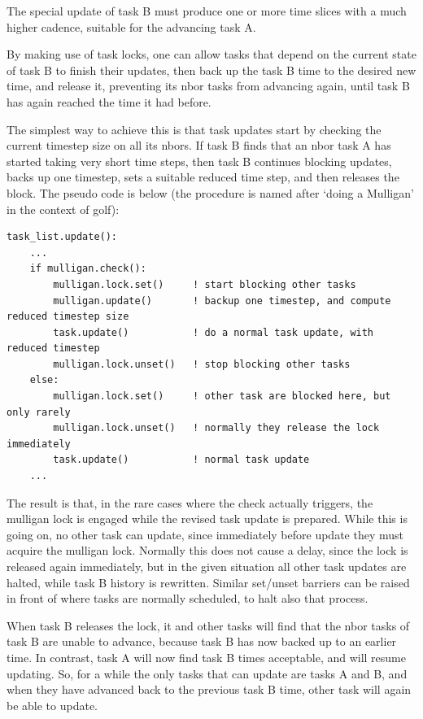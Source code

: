 \documentclass[paper=a4,fontsize=11pt]{scrartcl}
\numberwithin{equation}{section}		%
\numberwithin{figure}{section}			%
\numberwithin{table}{section}				%
\newcommand{\codecolor}{\color{Blue}}
\begin{document}
The special update of task B must produce one or more time slices with a much higher cadence, suitable for the advancing task A.

By making use of task locks, one can allow tasks that depend on the current state of task B to finish their updates, then back up the task B time to the desired new time, and release it, preventing its nbor tasks from advancing again, until task B has again reached the time it had before.

The simplest way to achieve this is that task updates start by checking the current timestep size on all its nbors. If task B finds that an nbor task A has started taking very short time steps, then task B continues blocking updates, backs up one timestep, sets a suitable reduced time step, and then releases the block.  The pseudo code is below (the procedure is named after `doing a Mulligan' in the context of golf):
{\codecolor\small\begin{verbatim}
task_list.update():
    ...
    if mulligan.check():
        mulligan.lock.set()     ! start blocking other tasks
        mulligan.update()       ! backup one timestep, and compute reduced timestep size
        task.update()           ! do a normal task update, with reduced timestep
        mulligan.lock.unset()   ! stop blocking other tasks
    else:
        mulligan.lock.set()     ! other task are blocked here, but only rarely
        mulligan.lock.unset()   ! normally they release the lock immediately
        task.update()           ! normal task update
    ...
\end{verbatim}}
The result is that, in the rare cases where the check actually triggers, the mulligan lock is engaged while the revised task update is prepared.  While this is going on, no other task can update, since immediately before update they must acquire the mulligan lock.  Normally this does not cause a delay, since the lock is released again immediately, but in the given situation all other task updates are halted, while task B history is rewritten.  Similar set/unset barriers can be raised in front of where tasks are normally scheduled, to halt also that process.

When task B releases the lock, it and other tasks will find that the nbor tasks of task B are unable to advance, because task B has now backed up to an earlier time.  In contrast, task A will now find task B times acceptable, and will resume updating.  So, for a while the only tasks that can update are tasks A and B, and when they have advanced back to the previous task B time, other task will again be able to update.
\end{document}
